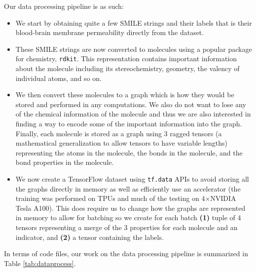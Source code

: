 \documentclass[fontsize=11pt]{article}
\begin{document}
Our data processing pipeline is as such:
\begin{itemize}
    \item We start by obtaining quite a few SMILE strings and their labels that is their blood-brain membrane permeability directly from the dataset.
    \item These SMILE strings are now converted to molecules using a popular package for chemistry, \texttt{rdkit}. This representation contains important information about the molecule including its stereochemistry, geometry, the valency of individual atoms, and so on.
    \item We then convert these molecules to a graph which is how they would be stored and performed in any computations. We also do not want to lose any of the chemical information of the molecule and thus we are also interested in finding a way to encode some of the important information into the graph. Finally, each molecule is stored as a graph using 3 ragged tensors (a mathematical generalization to allow tensors to have variable lengths) representing the atoms in the molecule, the bonds in the molecule, and the bond properties in the molecule.
    \item We now create a TensorFlow dataset using \texttt{tf.data} APIs to avoid storing all the graphs directly in memory as well as efficiently use an accelerator (the training was performed on TPUs and much of the testing on 4$\times$NVIDIA Tesla A100). This does require us to change how the graphs are represented in memory to allow for batching so we create for each batch \textbf{(1)} tuple of 4 tensors representing a merge of the 3 properties for each molecule and an indicator, and \textbf{(2)} a tensor containing the labels.
\end{itemize}

In terms of code files, our work on the data processing pipeline is summarized in Table \ref{tab:dataprocess}.
\end{document}
